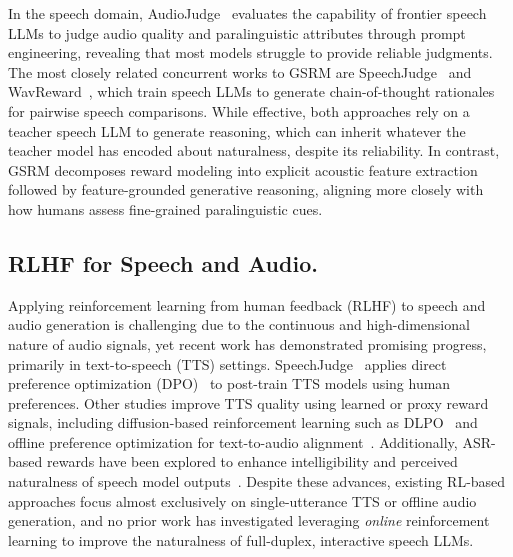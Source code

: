 In the speech domain, AudioJudge~\cite{manakul2025audiojudge} evaluates the capability of frontier speech LLMs to judge audio quality and paralinguistic attributes through prompt engineering, revealing that most models struggle to provide reliable judgments. The most closely related concurrent works to GSRM are SpeechJudge~\cite{zhang2025speechjudge} and WavReward~\cite{ji2025wavreward}, which train speech LLMs to generate chain-of-thought rationales for pairwise speech comparisons. While effective, both approaches rely on a teacher speech LLM to generate reasoning, which can inherit whatever the teacher model has encoded about naturalness, despite its reliability. In contrast, GSRM decomposes reward modeling into explicit acoustic feature extraction followed by feature-grounded generative reasoning, aligning more closely with how humans assess fine-grained paralinguistic cues.

\subsection{RLHF for Speech and Audio.}
Applying reinforcement learning from human feedback (RLHF) to speech and audio generation is challenging due to the continuous and high-dimensional nature of audio signals, yet recent work has demonstrated promising progress, primarily in text-to-speech (TTS) settings. SpeechJudge~\cite{manakul2025audiojudge} applies direct preference optimization (DPO)~\cite{rafailov2023direct} to post-train TTS models using human preferences. Other studies improve TTS quality using learned or proxy reward signals, including diffusion-based reinforcement learning such as DLPO~\cite{chen2024dlpo} and offline preference optimization for text-to-audio alignment~\cite{liao2024baton}. Additionally, ASR-based rewards have been explored to enhance intelligibility and perceived naturalness of speech model outputs~\cite{liu2025group}. Despite these advances, existing RL-based approaches focus almost exclusively on single-utterance TTS or offline audio generation, and no prior work has investigated leveraging \emph{online} reinforcement learning to improve the naturalness of full-duplex, interactive speech LLMs.
